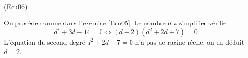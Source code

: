 \begin{tiny}(Ecu06)\end{tiny} On procède comme dans l'exercice \ref{Ecu05}. Le nombre $d$ à simplifier vérifie
\begin{displaymath}
  d^3+3d-14=0\Leftrightarrow (d-2)(d^2 + 2d +7)=0
\end{displaymath}
L'équation du second degré $d^2 + 2d +7=0$ n'a pas de racine réelle, on en déduit $d=2$.